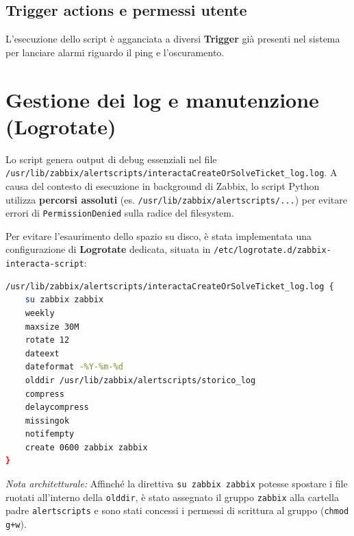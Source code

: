 \documentclass[12pt, a4paper]{report}
\begin{document}
\subsection{Trigger actions e permessi utente}
L'esecuzione dello script è agganciata a diversi \textbf{Trigger} già
presenti nel sistema per lanciare alarmi riguardo il ping e l'oscuramento.


\section{Gestione dei log e manutenzione (Logrotate)}
Lo script genera output di debug essenziali nel file 
\\\texttt{/usr/lib/zabbix/alertscripts/interactaCreateOrSolveTicket\_log.log}. 
A causa del contesto di esecuzione in background di Zabbix, 
lo script Python utilizza \textbf{percorsi assoluti} 
(es. \texttt{/usr/lib/zabbix/alertscripts/...}) per evitare errori di \texttt{PermissionDenied} sulla radice del filesystem.

Per evitare l'esaurimento dello spazio su disco, 
è stata implementata una configurazione di \textbf{Logrotate} dedicata, situata in \texttt{/etc/logrotate.d/zabbix-interacta-script}:

\begin{lstlisting}[language=bash, caption={Configurazione logrotate per i file di log dell'integrazione}]
/usr/lib/zabbix/alertscripts/interactaCreateOrSolveTicket_log.log {
    su zabbix zabbix
    weekly
    maxsize 30M
    rotate 12
    dateext
    dateformat -%Y-%m-%d
    olddir /usr/lib/zabbix/alertscripts/storico_log
    compress
    delaycompress
    missingok
    notifempty
    create 0600 zabbix zabbix
}
\end{lstlisting}
\textit{Nota architetturale:} Affinché la direttiva \texttt{su zabbix zabbix} 
potesse spostare i file ruotati all'interno della \texttt{olddir}, 
è stato assegnato il gruppo \texttt{zabbix} alla cartella padre \texttt{alertscripts} 
e sono stati concessi i permessi di scrittura al gruppo (\texttt{chmod g+w}).
\end{document}
